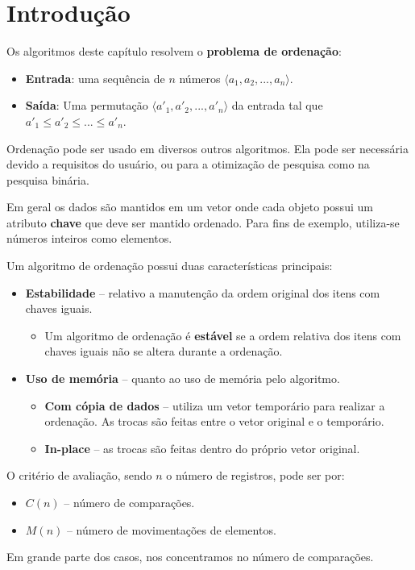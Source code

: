 \chapter{Introdução}

Os algoritmos deste capítulo resolvem o {\bf problema de ordenação}:
\begin{itemize}
\item {\bf Entrada}: uma sequência de $n$ números $\langle a_1, a_2, ..., a_n \rangle$.

\item {\bf Saída}:  Uma permutação $\langle {a'}_1, {a'}_2, ..., {a'}_n \rangle$ da
entrada tal que ${a'}_1 \leq {a'}_2 \leq ... \leq {a'}_n$.
\end{itemize}
Ordenação pode ser usado em diversos outros algoritmos.
Ela pode ser necessária devido a requisitos do usuário, ou para a otimização de pesquisa 
como na pesquisa binária.

Em geral os dados são mantidos em um vetor onde cada objeto possui um
atributo \textbf{chave} que deve ser mantido ordenado.
Para fins de exemplo, utiliza-se números inteiros como elementos.

Um algoritmo de ordenação possui duas características principais:
\begin{itemize}
\item {\bf Estabilidade} -- relativo a manutenção da ordem original dos itens 
com chaves iguais.
	\begin{itemize}
	\item Um algoritmo de ordenação é {\bf estável} se a ordem relativa dos itens
		com chaves iguais não se altera durante a ordenação.
	\end{itemize}
\item {\bf Uso de memória} -- quanto ao uso de memória pelo algoritmo.
	\begin{itemize}
	\item {\bf Com cópia de dados} -- utiliza um vetor temporário para realizar a ordenação. As trocas são feitas entre o vetor original e o temporário.
	\item {\bf In-place} -- as trocas são feitas dentro do próprio vetor original.
	\end{itemize}
\end{itemize}

O critério de avaliação, sendo $n$ o número de registros, pode ser por:
\begin{itemize}
\item $C(n)$ -- número de comparações.
\item $M(n)$ -- número de movimentações de elementos.
\end{itemize}
Em grande parte dos casos, nos concentramos no número de comparações.

